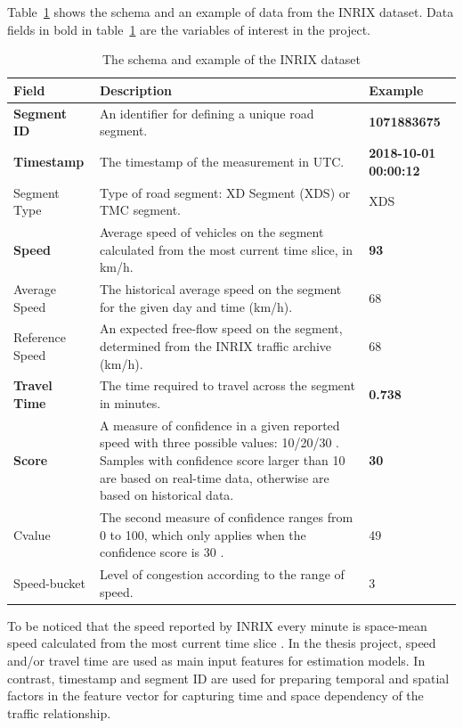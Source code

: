 \documentclass[english]{kththesis}
\begin{document}
Table~\ref{tab:inrix_schema} shows the schema and an example of data from the INRIX dataset. Data fields in bold in table~\ref{tab:inrix_schema} are the variables of interest in the project.

\begin{table}[!ht]
    \begin{tabular}{@{} m{} m{} m{} @{}}
    \toprule
    \textbf{Field} & \textbf{Description} & \textbf{Example} \\
    \midrule
    \textbf{Segment ID} & An identifier for defining a unique road segment. & \textbf{1071883675} \\ 
    \midrule
    \textbf{Timestamp} & The timestamp of the measurement in UTC. & \textbf{2018-10-01 00:00:12} \\
    \midrule
    Segment Type & Type of road segment: XD Segment (XDS) or TMC segment. & XDS \\
    \midrule
    \textbf{Speed} & Average speed of vehicles on the segment calculated from the most current time slice, in km/h. & \textbf{93} \\ 
    \midrule
    Average Speed & The historical average speed on the segment for the given day and time (km/h). & 68 \\ 
    \midrule
    Reference Speed & An expected free-flow speed on the segment, determined from the INRIX traffic archive (km/h). & 68 \\ 
    \midrule
    \textbf{Travel Time} & The time required to travel across the segment in minutes. & \textbf{0.738} \\ 
    \midrule
    \textbf{Score} & A measure of confidence in a given reported speed with three possible values: 10/20/30 \cite{kim_inrix_data_comparing}. Samples with confidence score larger than 10 are based on real-time data, otherwise are based on historical data. & \textbf{30} \\ 
    \midrule
    Cvalue & The second measure of confidence ranges from 0 to 100, which only applies when the confidence score is 30 \cite{kim_inrix_data_comparing}. & 49 \\ 
    \midrule
    Speed-bucket & Level of congestion according to the range of speed. & 3 \\
    \bottomrule
    \end{tabular}
    \caption{The schema and example of the INRIX dataset}
    \label{tab:inrix_schema}
\end{table}

To be noticed that the speed reported by INRIX every minute is space-mean speed calculated from the most current time slice \cite{sharma_inrix_data_opportunity}. In the thesis project, speed and/or travel time are used as main input features for estimation models. In contrast, timestamp and segment ID are used for preparing temporal and spatial factors in the feature vector for capturing time and space dependency of the traffic relationship.
\end{document}
